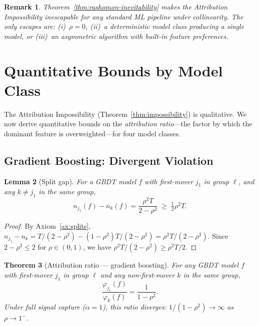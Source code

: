 \documentclass{article}
\newtheorem{theorem}{Theorem}
\newtheorem{lemma}[theorem]{Lemma}
\newtheorem{remark}[theorem]{Remark}
\newcommand{\GBDT}{\textsc{GBDT}}
\begin{document}
\begin{remark}
Theorem~\ref{thm:rashomon-inevitability} makes the Attribution Impossibility inescapable for any standard ML pipeline under collinearity. The only escapes are: (i)~$\rho = 0$, (ii)~a deterministic model class producing a single model, or (iii)~an asymmetric algorithm with built-in feature preferences.
\end{remark}


\section{Quantitative Bounds by Model Class}
\label{sec:bounds}

The Attribution Impossibility (Theorem~\ref{thm:impossibility}) is qualitative. We now derive quantitative bounds on the \emph{attribution ratio}---the factor by which the dominant feature is overweighted---for four model classes.

\subsection{Gradient Boosting: Divergent Violation}
\label{sec:gbdt-bounds}

\begin{lemma}[Split gap]
\label{lem:split-gap}
For a \GBDT{} model $f$ with first-mover $j_1$ in group $\ell$, and any $k \neq j_1$ in the same group,
\[
    n_{j_1}(f) - n_k(f) = \frac{\rho^2 T}{2 - \rho^2} \;\geq\; \tfrac{1}{2}\rho^2 T.
\]
\end{lemma}

\begin{proof}
By Axiom~\ref{ax:splits}, $n_{j_1} - n_k = T/(2-\rho^2) - (1-\rho^2)T/(2-\rho^2) = \rho^2 T/(2-\rho^2)$.
Since $2 - \rho^2 \leq 2$ for $\rho \in (0,1)$, we have $\rho^2 T/(2-\rho^2) \geq \rho^2 T/2$.
\end{proof}

\begin{theorem}[Attribution ratio --- gradient boosting]
\label{thm:ratio}
For any \GBDT{} model $f$ with first-mover $j_1$ in group $\ell$ and any non-first-mover $k$ in the same group,
\[
    \frac{\varphi_{j_1}(f)}{\varphi_k(f)} = \frac{1}{1 - \rho^2}.
\]
Under full signal capture ($\alpha{=}1$), this ratio diverges: $1/(1-\rho^2) \to \infty$ as $\rho \to 1^-$.
\end{theorem}
\end{document}
